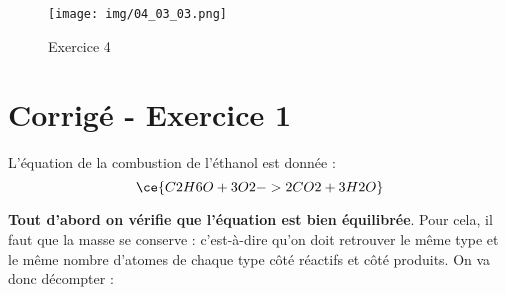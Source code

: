 \documentclass[a4paper,12pt]{article}
\begin{document}
\begin{figure}[H]
  \centering
  \texttt{[image: img/04\_03\_03.png]}
  \caption{\label{} Exercice 4}
\end{figure}

\section{Corrigé - Exercice 1}

L'équation de la combustion de l'éthanol est donnée :
\[
\ce{C2H6O + 3 O2 -> 2 CO2 + 3 H2O}
\]

\textbf{Tout d'abord on vérifie que l'équation est bien équilibrée}. Pour cela, il faut que la masse se conserve : c'est-à-dire qu'on doit retrouver le même type et le même nombre d'atomes de chaque type côté réactifs et côté produits. On va donc décompter :
\end{document}
